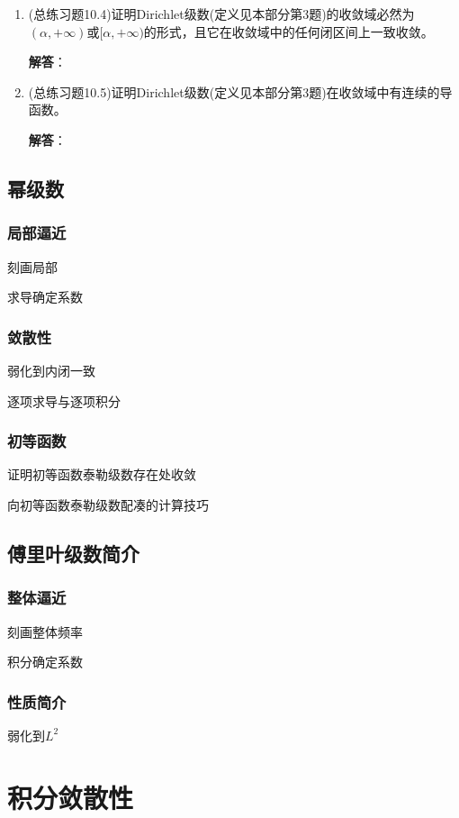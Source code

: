 \documentclass[a4paper,UTF8,fontset=windows,AutoFakeBold]{ctexart}
\theoremstyle{ex}
\newcommand{\sol}[1]{{\vspace{5pt}\kaishu\noindent\textbf{解答}：\vspace{-3pt}
\begin{compactitem}
    \item[] #1
\end{compactitem}
}}
\begin{document}
\begin{enumerate}
{    }

    \item (总练习题10.4)证明Dirichlet级数(定义见本部分第3题)的收敛域必然为$(\alpha,+\infty)$或$[\alpha,+\infty)$的形式，且它在收敛域中的任何闭区间上一致收敛。

    
    \sol{

    }

    \item (总练习题10.5)证明Dirichlet级数(定义见本部分第3题)在收敛域中有连续的导函数。
    
    \sol{

    }
    
\end{enumerate}

\subsection{幂级数}
\subsubsection{局部逼近}
刻画局部

求导确定系数

\subsubsection{敛散性}
弱化到内闭一致

逐项求导与逐项积分

\subsubsection{初等函数}
证明初等函数泰勒级数存在处收敛

向初等函数泰勒级数配凑的计算技巧

\subsection{傅里叶级数简介}
\subsubsection{整体逼近}
刻画整体频率

积分确定系数

\subsubsection{性质简介}
弱化到$L^2$

\newpage
\section{积分敛散性}
\end{document}
